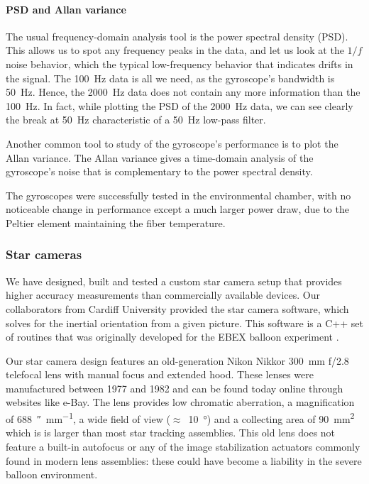 \paragraph{PSD and Allan variance}

The usual frequency-domain analysis tool is the power spectral density (PSD). This allows us to spot any frequency peaks in the data, and let us look at the $1/f$ noise behavior, which the typical low-frequency behavior that indicates drifts in the signal. The \SI{100}{\hertz} data is all we need, as the gyroscope's bandwidth is \SI{50}{\hertz}. Hence, the \SI{2000}{\hertz} data does not contain any more information than the \SI{100}{\hertz}. In fact, while plotting the PSD of the \SI{2000}{\hertz} data, we can see clearly the break at \SI{50}{\hertz} characteristic of a \SI{50}{\hertz} low-pass filter.

Another common tool to study of the gyroscope's performance is to plot the Allan variance. The Allan variance gives a time-domain analysis of the gyroscope's noise that is complementary to the power spectral density.

The gyroscopes were successfully tested in the environmental chamber, with no noticeable change in performance except a much larger power draw, due to the Peltier element maintaining the fiber temperature.

\subsubsection{Star cameras}

We have designed, built and tested a custom star camera setup that provides higher accuracy measurements than commercially available devices. Our collaborators from Cardiff University provided the star camera software, which solves for the inertial orientation from a given picture. This software is a C++ set of routines that was originally developed for the EBEX balloon experiment \citep{Oxley:2004hl}. 

Our star camera design features an old-generation Nikon Nikkor \SI{300}{\mm} f/2.8 telefocal lens with manual focus and extended hood. These lenses were manufactured between 1977 and 1982 and can be found today online through websites like e-Bay. The lens provides low chromatic aberration, a magnification of \SI{688}{\arcsecond\per\mm}, a wide field of view ($\approx$~\SI{10}{\degree}) and a collecting area of \SI{90}{\mm\squared} which is is larger than most star tracking assemblies. This old lens does not feature a built-in autofocus or any of the image stabilization actuators commonly found in modern lens assemblies: these could have become a liability in the severe balloon environment. 

